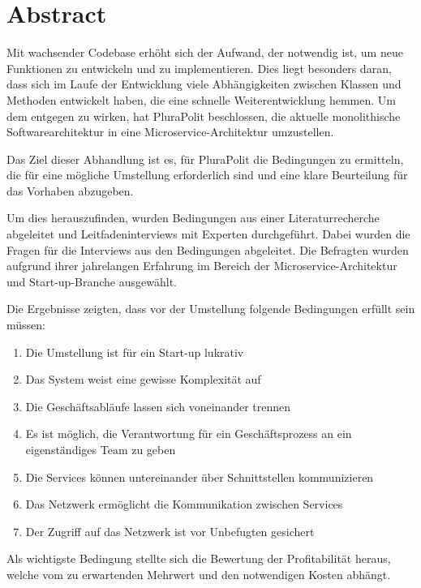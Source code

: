 \section*{Abstract}

Mit wachsender Codebase erhöht sich der Aufwand, der notwendig ist, um neue Funktionen zu entwickeln und zu implementieren. Dies liegt besonders daran, dass sich im Laufe der Entwicklung viele Abhängigkeiten zwischen Klassen und Methoden entwickelt haben, die eine schnelle Weiterentwicklung hemmen. Um dem entgegen zu wirken, hat PluraPolit beschlossen, die aktuelle monolithische Softwarearchitektur in eine Microservice-Architektur umzustellen.


Das Ziel dieser Abhandlung ist es, für PluraPolit die Bedingungen zu ermitteln, die für eine mögliche Umstellung erforderlich sind und eine klare Beurteilung für das Vorhaben abzugeben.

Um dies herauszufinden, wurden Bedingungen aus einer Literaturrecherche abgeleitet und Leitfadeninterviews mit Experten durchgeführt. Dabei wurden die Fragen für die Interviews aus den Bedingungen abgeleitet. Die Befragten wurden aufgrund ihrer jahrelangen Erfahrung im Bereich der Microservice-Architektur und Start-up-Branche ausgewählt.

Die Ergebnisse zeigten, dass vor der Umstellung folgende Bedingungen erfüllt sein müssen:
\begin{enumerate}
	\item Die Umstellung ist für ein Start-up lukrativ
	\item Das System weist eine gewisse Komplexität auf
	\item Die Geschäftsabläufe lassen sich voneinander trennen
	\item Es ist möglich, die Verantwortung für ein Geschäftsprozess an ein eigenständiges Team zu geben
	\item Die Services können untereinander über Schnittstellen kommunizieren
	\item Das Netzwerk ermöglicht die Kommunikation zwischen Services
	\item Der Zugriff auf das Netzwerk ist vor Unbefugten gesichert
\end{enumerate}

Als wichtigste Bedingung stellte sich die Bewertung der Profitabilität heraus, welche vom zu erwartenden Mehrwert und den notwendigen Kosten abhängt.

